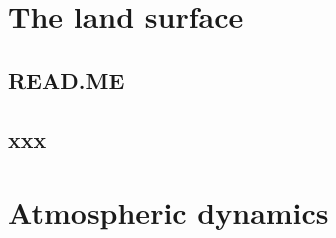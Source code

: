 \documentclass[11pt,fleqn]{book} %
\begin{document}

\cleardoublepage


\chapter{The land surface}

\hfill \break

\vspace{24mm}

\noindent 


\newpage


\section*{READ.ME}



\newpage


\section{xxx}


%

\cleardoublepage


\chapter{Atmospheric dynamics}

\hfill \break

\vspace{24mm}

\noindent 

\end{document}

